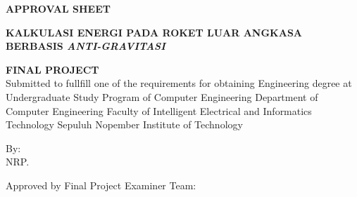 \begin{center}
  \large
  \textbf{APPROVAL SHEET}
\end{center}

\thispagestyle{empty}

\begin{center}
  \textbf{KALKULASI ENERGI PADA ROKET LUAR ANGKASA BERBASIS \emph{ANTI-GRAVITASI}}
\end{center}

\begingroup
\small


\begin{center}
  \textbf{FINAL PROJECT}
  \\Submitted to fullfill one of the requirements for obtaining Engineering degree at Undergraduate Study Program of Computer Engineering Department of Computer Engineering Faculty of Intelligent Electrical and Informatics Technology Sepuluh Nopember Institute of Technology
\end{center}

\begin{center}
  By: \name{}
  \\NRP. \nrp{}
\end{center}

\begin{center}
  Approved by Final Project Examiner Team:
\end{center}


\begingroup
\setlength{\tabcolsep}{0pt}

